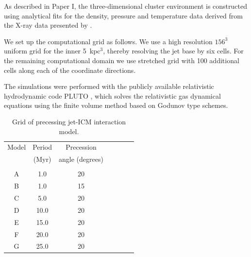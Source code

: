 \documentclass[useAMS, usenatbib]{mn2e}
\begin{document}
As described in Paper I, the three-dimensional cluster environment is constructed using analytical fits for the density, pressure and temperature data derived from the X-ray data presented by \citet{david01}.
 
We set up the computational grid as follows. We use a high resolution $156^3$ uniform grid for the inner 5~kpc$^3$, thereby resolving the jet base by six cells. For the remaining computational domain we use stretched grid with 100 additional cells along each of the coordinate directions. 

The simulations were performed with the publicly available relativistic hydrodynamic code PLUTO \citep{mignone07}, which solves the relativistic gas dynamical equations using the finite volume method based on Godunov type schemes. 

\begin{table}
\centering
\caption{Grid of precessing jet-ICM interaction model. }
\begin{threeparttable}
\begin{tabular}{*{7}{c}}
\hline \hline
Model &   Period & Precession   \\
      & (Myr)  & angle (degrees) \\ 
 \\ \hline
   A & 1.0 & 20 \\
   B & 1.0 & 15  \\
   C & 5.0  & 20  \\
   D & 10.0 & 20 \\
   E & 15.0 & 20 \\
   F & 20.0 & 20 \\
   G & 25.0 & 20 \\
\hline
\end{tabular}
\label{t:mod}
\end{threeparttable}
\end{table}

%
%
\end{document}
